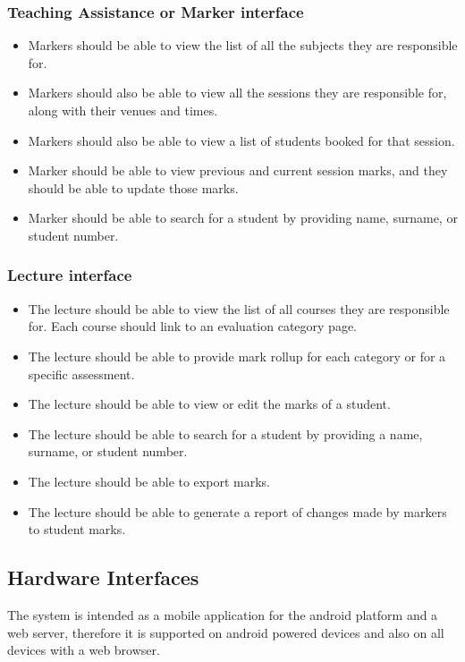 \documentclass[10pt,a4paper]{article}
\begin{document}
\subsubsection{Teaching Assistance or Marker interface}
\label{Teaching Assistance or Marker interface}

\begin{itemize}
\item Markers should be able to view the list of all the subjects they are responsible for.
\item Markers should also be able to view all the sessions they are responsible for, along with their venues and times.
\item Markers should also be able to view a list of students booked for that session.
\item Marker should be able to view previous and current session marks, and they should be able to update those marks.
\item Marker should be able to search for a student by providing name, surname, or student number.
\end{itemize}

\subsubsection{Lecture interface}
\label{Lecture interface}

\begin{itemize}
\item The lecture should be able to view the list of all courses they are responsible for. Each course should link to an evaluation category page.
\item The lecture should be able to provide mark rollup for each category or for a specific assessment.
\item The lecture should be able to view or edit the marks of a student.
\item The lecture should be able to search for a student by providing a name, surname, or student number.
\item The lecture should be able to export marks.
\item The lecture should be able to generate a report of changes made by markers to student marks.
\end{itemize}

\subsection{Hardware Interfaces}
\label{Hardware Interfaces}
The system is intended as a mobile application for the android platform and a web server, therefore it is supported on android powered devices and also on all devices with a web browser.
\end{document}
